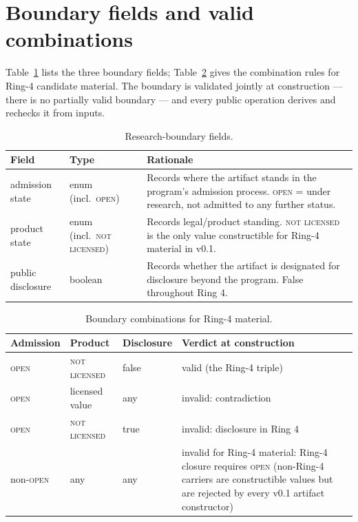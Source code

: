 \section{Boundary fields and valid combinations}\label{tables:boundary}

Table~\ref{tables:tab:boundaryfields} lists the three boundary fields; Table~\ref{tables:tab:boundarycombos} gives the combination rules for Ring-4 candidate material. The boundary is validated jointly at construction --- there is no partially valid boundary --- and every public operation derives and rechecks it from inputs.

\begin{table}[htbp]
\centering
\caption{Research-boundary fields.}
\label{tables:tab:boundaryfields}
\begin{tabular}{@{}p{}p{}p{}@{}}
\toprule
Field & Type & Rationale \\
\midrule
admission state & enum (incl.\ \textsc{open}) & Records where the artifact stands in the program's admission process. \textsc{open} = under research, not admitted to any further status. \\
\addlinespace
product state & enum (incl.\ \textsc{not licensed}) & Records legal/product standing. \textsc{not licensed} is the only value constructible for Ring-4 material in v0.1. \\
\addlinespace
public disclosure & boolean & Records whether the artifact is designated for disclosure beyond the program. False throughout Ring 4. \\
\bottomrule
\end{tabular}
\end{table}

\begin{table}[htbp]
\centering
\caption{Boundary combinations for Ring-4 material.}
\label{tables:tab:boundarycombos}
\begin{tabular}{@{}llll@{}}
\toprule
Admission & Product & Disclosure & Verdict at construction \\
\midrule
\textsc{open} & \textsc{not licensed} & false & valid (the Ring-4 triple) \\
\textsc{open} & licensed value & any & invalid: contradiction \\
\textsc{open} & \textsc{not licensed} & true & invalid: disclosure in Ring 4 \\
non-\textsc{open} & any & any & invalid for Ring-4 material: Ring-4 closure requires \textsc{open} (non-Ring-4 carriers are constructible values but are rejected by every v0.1 artifact constructor) \\
\bottomrule
\end{tabular}
\end{table}

